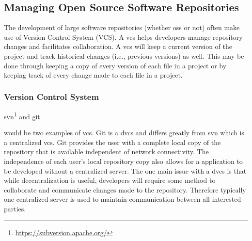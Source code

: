 \addtocounter{footnote}{-4}

\addtocounter{footnote}{1}

\addtocounter{footnote}{1}

\addtocounter{footnote}{1}

\addtocounter{footnote}{1}




\subsection{Managing Open Source Software Repositories}

The development of large software repositories (whether \gls{oss} or not) often make use of Version Control System (VCS). A \gls{vcs} helps developers manage repository changes and facilitates collaboration. A \gls{vcs} will keep a current version of the project and track historical changes (i.e., previous versions) as well. This may be done through keeping a copy of every version of each file in a project or by keeping track of every change made to each file in a project. 


\subsubsection{Version Control System}

\gls{svn}\footnote{\url{https://subversion.apache.org/}} and git\addtocounter{footnote}{-2}\footnotemark{} would be two examples of \gls{vcs}. Git is a \gls{dvcs} and differs greatly from \gls{svn} which is a centralized \gls{vcs}. Git provides the user with a complete local copy of the repository that is available independent of network connectivity. The independence of each user's local repository copy also allows for a application to be developed without a centralized server. The one main issue with a \gls{dvcs} is that while decentralization is useful, developers will require some method to collaborate and communicate changes made to the repository. Therefore typically one centralized server is used to maintain communication between all interested parties.

